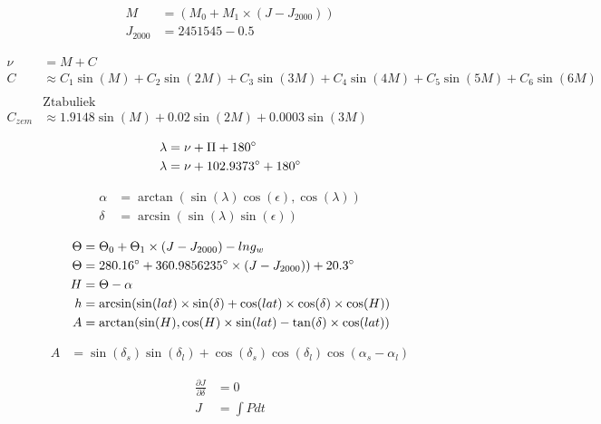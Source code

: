 \documentclass{minimal}
\begin{document}
\begin{equation*}\begin{split}
M & = (M_0 + M_1 \times (J - J_{2000})) \\
J_{2000} &= 2451545 - 0.5
\end{split}\end{equation*}

\newpage

\begin{equation*}\begin{split}
\nu & = M + C \\
C & \approx C_1 \sin (M) + C_2 \sin (2M) + C_3 \sin (3M) + C_4 \sin (4M) + C_5 \sin (5M) + C_6 \sin (6M)\\
\\
& \mathrm{Z tabuliek}\\
C_{zem} & \approx 1.9148 \sin (M) + 0.02 \sin (2M) + 0.0003 \sin (3M)
\end{split}\end{equation*}

\newpage

\begin{equation*}\begin{split}
\lambda &= \nu + \Pi + 180\degree \\
\lambda &= \nu + 102.9373\degree + 180\degree
\end{split}\end{equation*}

\newpage

\begin{equation*}\begin{split}
\alpha &= \arctan\left(\sin(\lambda) \cos(\epsilon), \cos(\lambda)\right)\\
\delta &= \arcsin\left(\sin(\lambda) \sin(\epsilon)\right)
\end{split}\end{equation*}

\newpage

\begin{equation*}\begin{split}
\Theta & = \Theta_0 + \Theta_1 \times (J - J_{2000}) - lng_{w} \\
\Theta & = 280.16 \degree + 360.9856235 \degree \times (J - J_{2000})) + 20.3 \degree \\
H &= \Theta - \alpha \\
h &= \arcsin(\sin(lat) \times \sin(\delta) + \cos(lat) \times \cos(\delta) \times \cos(H)) \\
A &= \arctan(\sin(H), \cos(H) \times \sin(lat) - \tan(\delta) \times \cos(lat))
\end{split}\end{equation*}

\newpage

\begin{equation*}\begin{split}
A & = \sin(\delta_s) \sin(\delta_l) + \cos(\delta_s) \cos(\delta_l) \cos(\alpha_s - \alpha_l)
\end{split}\end{equation*}

\newpage

\begin{equation*}\begin{split}
\frac{\partial J}{\partial \delta} & = 0 \\
J & = \int { P } dt
\end{split}\end{equation*}
\end{document}
